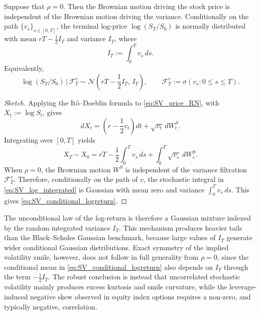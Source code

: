 \begin{definition}
Suppose that $\rho=0$. Then the Brownian motion driving the stock price
is independent of the Brownian motion driving the variance. Conditionally
on the path $\{v_s\}_{s\in[0,T]}$, the terminal log-price
$\log(S_T/S_0)$ is normally distributed with mean
$rT-\frac12 I_T$ and variance $I_T$, where
\begin{equation}\label{eq:integrated_variance}
I_T
:=
\int_0^T v_s\,ds.
\end{equation}
Equivalently,
\begin{equation}\label{eq:SV_conditional_logreturn}
\log(S_T/S_0)\,\big|\,\mathcal{F}^{v}_{T}
\sim
\mathcal{N}\!\left(
rT-\frac12 I_T,\,
I_T
\right),
\qquad
\mathcal{F}^{v}_{T}:=\sigma(v_s:0\leq s\leq T).
\end{equation}
\end{definition}

\begin{proof}[Sketch]
Applying the It\^o--Doeblin formula to
\eqref{eq:SV_price_RN}, with $X_t:=\log S_t$, gives
\begin{equation}
dX_t
=
\left(r-\frac12 v_t\right)dt+\sqrt{v_t}\,dW^S_t.
\end{equation}
Integrating over $[0,T]$ yields
\begin{equation}\label{eq:SV_log_integrated}
X_T-X_0
=
rT-\frac12\int_0^T v_s\,ds
+
\int_0^T \sqrt{v_s}\,dW^S_s.
\end{equation}
When $\rho=0$, the Brownian motion $W^S$ is independent of the variance
filtration $\mathcal{F}^{v}_{T}$. Therefore, conditionally on the path of
$v$, the stochastic integral in \eqref{eq:SV_log_integrated} is Gaussian
with mean zero and variance $\int_0^T v_s\,ds$. This gives
\eqref{eq:SV_conditional_logreturn}.
\end{proof}

The unconditional law of the log-return is therefore a Gaussian mixture
indexed by the random integrated variance $I_T$. This mechanism produces
heavier tails than the Black--Scholes Gaussian benchmark, because large
values of $I_T$ generate wider conditional Gaussian distributions. Exact
symmetry of the implied volatility smile, however, does not follow in
full generality from $\rho=0$, since the conditional mean in
\eqref{eq:SV_conditional_logreturn} also depends on $I_T$ through the
term $-\frac12 I_T$. The robust conclusion is instead that uncorrelated
stochastic volatility mainly produces excess kurtosis and smile
curvature, while the leverage-induced negative skew observed in equity
index options requires a non-zero, and typically negative, correlation.

